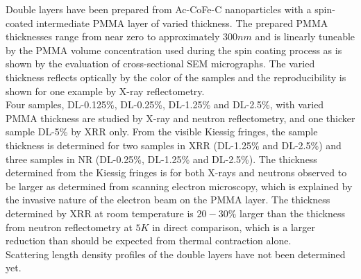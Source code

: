 \documentclass[\main/dresen_thesis.tex]{subfiles}
\begin{document}
  \label{sec:doublelayers:structuralCharacterization:summary}

  Double layers have been prepared from Ac-CoFe-C nanoparticles with a spin-coated intermediate PMMA layer of varied thickness.
  The prepared PMMA thicknesses range from near zero to approximately $300 \unit{nm}$ and is linearly tuneable by the PMMA volume concentration used during the spin coating process as is shown by the evaluation of cross-sectional SEM micrographs.
  The varied thickness reflects optically by the color of the samples and the reproducibility is shown for one example by X-ray reflectometry.
  \\

  Four samples, DL-0.125\%, DL-0.25\%, DL-1.25\% and DL-2.5\%, with varied PMMA thickness are studied by X-ray and neutron reflectometry, and one thicker sample DL-5\% by XRR only.
  From the visible Kiessig fringes, the sample thickness is determined for two samples in XRR (DL-1.25\% and DL-2.5\%) and three samples in NR (DL-0.25\%, DL-1.25\% and DL-2.5\%).
  The thickness determined from the Kiessig fringes is for both X-rays and neutrons observed to be larger as determined from scanning electron microscopy, which is explained by the invasive nature of the electron beam on the PMMA layer.
  The thickness determined by XRR at room temperature is $20 - 30\%$ larger than the thickness from neutron reflectometry at $5 \unit{K}$ in direct comparison, which is a larger reduction than should be expected from thermal contraction alone.
  \\

  Scattering length density profiles of the double layers have not been determined yet.
\end{document}
